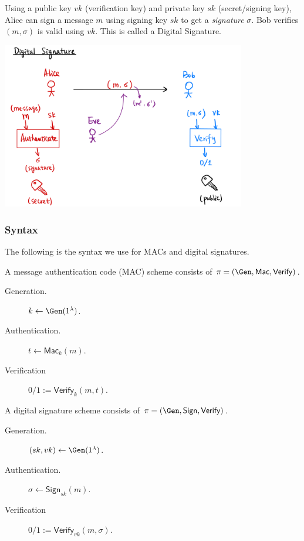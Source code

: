 Using a public key $vk$ (verification key) and private key $sk$ (secret/signing key), Alice can sign a message $m$ using signing key $sk$ to get a \emph{signature} $\sigma$. Bob verifies $(m, \sigma)$ is valid using $vk$. This is called a Digital Signature.

\begin{center}
    \includegraphics[width=0.8\textwidth]{images/2023-02-02/signature.png}
\end{center}

\subsubsection{Syntax}\label{sec:message-integrity:syntax}
The following is the syntax we use for MACs and digital signatures.

A message authentication code (MAC) scheme consists of $\pi = (\Gen, \mathsf{Mac}, \mathsf{Verify})$.
\begin{description}
    \item[Generation.] $k\leftarrow \Gen(1^\lambda)$.
    \item[Authentication.] $t \leftarrow \mathsf{Mac}_k(m)$.
    \item[Verification] $0/1 := \mathsf{Verify}_k(m, t)$.
\end{description}

A digital signature scheme consists of $\pi = (\Gen, \mathsf{Sign}, \mathsf{Verify})$.
\begin{description}
    \item[Generation.] $(sk, vk)\leftarrow \Gen(1^\lambda)$.
    \item[Authentication.] $\sigma \leftarrow \mathsf{Sign}_{sk}(m)$.
    \item[Verification] $0/1 := \mathsf{Verify}_{vk}(m, \sigma)$.
\end{description}

